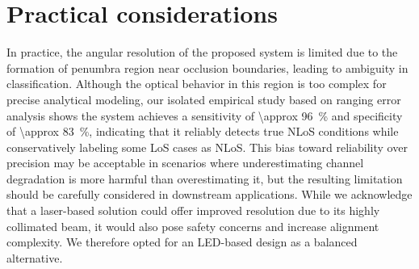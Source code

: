 \section{Practical considerations}
In practice, the angular resolution of the proposed system is limited due to the formation of penumbra region near occlusion boundaries, leading to ambiguity in classification. Although the optical behavior in this region is too complex for precise analytical modeling, our isolated empirical study based on ranging error analysis shows the system achieves a sensitivity of \SI{\approx 96}{\percent} and specificity of \SI{\approx 83}{\percent}, indicating that it reliably detects true NLoS conditions while conservatively labeling some LoS cases as NLoS. This bias toward reliability over precision may be acceptable in scenarios where underestimating channel degradation is more harmful than overestimating it, but the resulting limitation should be carefully considered in downstream applications. While we acknowledge that a laser-based solution could offer improved resolution due to its highly collimated beam, it would also pose safety concerns and increase alignment complexity. We therefore opted for an LED-based design as a balanced alternative.
